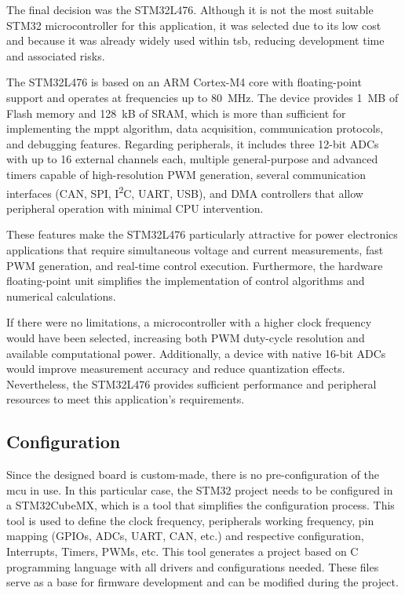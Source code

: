        The final decision was the STM32L476. Although it is not the most suitable STM32 microcontroller for this application, it was selected due to its low cost and because it was already widely used within \ac{tsb}, reducing development time and associated risks.

        The STM32L476 is based on an ARM Cortex-M4 core with floating-point support and operates at frequencies up to 80~MHz. The device provides 1~MB of Flash memory and 128~kB of SRAM, which is more than sufficient for implementing the \ac{mppt} algorithm, data acquisition, communication protocols, and debugging features. Regarding peripherals, it includes three 12-bit ADCs with up to 16 external channels each, multiple general-purpose and advanced timers capable of high-resolution PWM generation, several communication interfaces (CAN, SPI, I\textsuperscript{2}C, UART, USB), and DMA controllers that allow peripheral operation with minimal CPU intervention.

        These features make the STM32L476 particularly attractive for power electronics applications that require simultaneous voltage and current measurements, fast PWM generation, and real-time control execution. Furthermore, the hardware floating-point unit simplifies the implementation of control algorithms and numerical calculations.

        If there were no limitations, a microcontroller with a higher clock frequency would have been selected, increasing both PWM duty-cycle resolution and available computational power. Additionally, a device with native 16-bit ADCs would improve measurement accuracy and reduce quantization effects. Nevertheless, the STM32L476 provides sufficient performance and peripheral resources to meet this application's requirements.

    \subsection{Configuration}
        Since the designed board is custom-made, there is no pre-configuration of the \ac{mcu} in use. In this particular case, the STM32 project needs to be configured in a STM32CubeMX, which is a tool that simplifies the configuration process. This tool is used to define the clock frequency, peripherals working frequency, pin mapping (GPIOs, ADCs, UART, CAN, etc.) and respective configuration, Interrupts, Timers, PWMs, etc. This tool generates a project based on C programming language with all drivers and configurations needed. These files serve as a base for firmware development and can be modified during the project.

